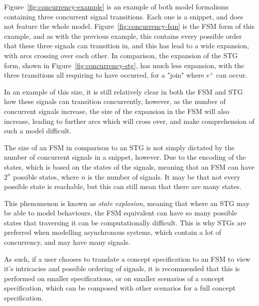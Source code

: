 Figure~\ref{fig:concurrency-example} is an example of both model formalisms containing three 
concurrent signal transitions. Each one is a snippet, and does not feature the whole model. 
Figure~\ref{fig:concurrency-fsm} is the FSM form of this example, and as with the previous example, 
this contains every possible order that these three signals can transition in, and this has lead to a wide 
expansion, with arcs crossing over each other. In comparison, the expansion of the STG form, shown in 
Figure~\ref{fig:concurrency-stg}, has much less expansion, with the three transitions all requiring to 
have occurred, for a "join" where $e^{+}$ can occur. 

In an example of this size, it is still relatively clear in both the FSM and STG how these signals can 
transition concurrently, however, as the number of concurrent signals increase, the size of the 
expansion in the FSM will also increase, leading to further arcs which will cross over, and make 
comprehension of such a model difficult. 

The size of an FSM in comparison to an STG is not simply dictated by the number of concurrent signals 
in a snippet, however. Due to the encoding of the states, which is based on the states of the signals, 
meaning that an FSM can have $2^{n}$ possible states, where $n$ is the number of signals. It may be
that not every possible state is reachable, but this can still mean that there are many states. 

This phenomenon is known as \emph{state explosion}, meaning that where an STG may be able to 
model behaviours, the FSM equivalent can have so many possible states that traversing it can be 
computationally difficult. This is why STGs are preferred when modelling asynchronous systems, which 
contain a lot of concurrency, and may have many signals. 

As such, if a user chooses to translate a concept specification to an FSM to view it's intricacies and 
possible ordering of signals, it is recommended that this is performed on smaller specifications, or on 
smaller scenarios of a concept specification, which can be composed with other scenarios for a full 
concept specification.
 